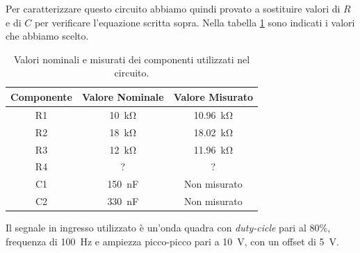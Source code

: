 Per caratterizzare questo circuito abbiamo quindi provato a sostituire valori di $R$ e di $C$ per verificare l'equazione scritta sopra. Nella tabella \ref{tab:valori_componenti_2} sono indicati i valori che abbiamo scelto.

\def\arraystretch{1.3}
\begin{table}[h]
	\centering
	\begin{tabular}{|c|c|c|}
		\hline
		Componente	& Valore Nominale & Valore Misurato \\ \hline
		R1 &\SI{10}{\kilo\ohm} & \SI{10,96}{\kilo\ohm} \\ \hline
		R2 &\SI{18}{\kilo\ohm} & \SI{18,02}{\kilo\ohm} \\ \hline
		R3 & \SI{12}{\kilo\ohm} & \SI{11,96}{\kilo\ohm} \\ \hline
		R4 & ? & ? \\ \hline
		C1 & \SI{150}{\nano\farad} & Non misurato \\ \hline
		C2 & \SI{330}{\nano\farad} & Non misurato \\ \hline
	\end{tabular}
	\caption{Valori nominali e misurati dei componenti utilizzati nel circuito.}
	\label{tab:valori_componenti_2}
\end{table}
Il segnale in ingresso utilizzato è un'onda quadra con \textit{duty-cicle} pari al 80\%, frequenza di \SI{100}{\hertz} e ampiezza picco-picco pari a \SI{10}{\volt}, con un offset di \SI{5}{\volt}.
